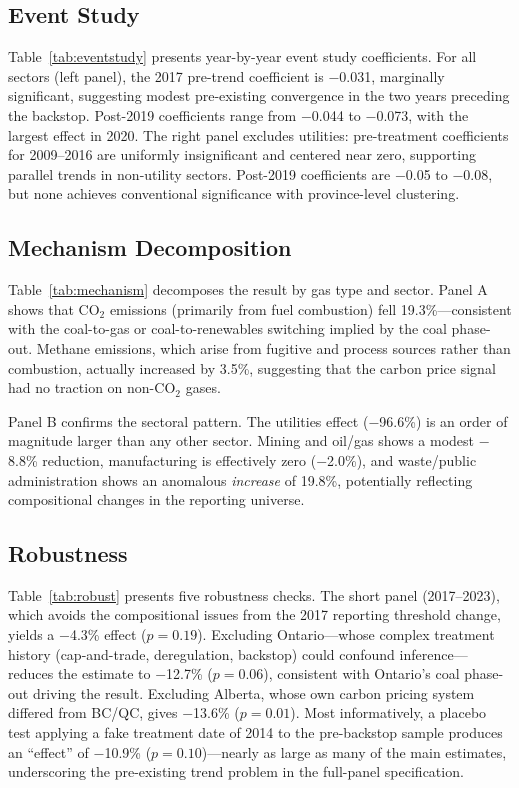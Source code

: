 \documentclass[12pt]{article}
\begin{document}
\subsection{Event Study}



Table~\ref{tab:eventstudy} presents year-by-year event study coefficients. For all sectors (left panel), the 2017 pre-trend coefficient is $-$0.031, marginally significant, suggesting modest pre-existing convergence in the two years preceding the backstop. Post-2019 coefficients range from $-$0.044 to $-$0.073, with the largest effect in 2020. The right panel excludes utilities: pre-treatment coefficients for 2009--2016 are uniformly insignificant and centered near zero, supporting parallel trends in non-utility sectors. Post-2019 coefficients are $-$0.05 to $-$0.08, but none achieves conventional significance with province-level clustering.

\subsection{Mechanism Decomposition}



Table~\ref{tab:mechanism} decomposes the result by gas type and sector. Panel A shows that CO$_2$ emissions (primarily from fuel combustion) fell 19.3\%---consistent with the coal-to-gas or coal-to-renewables switching implied by the coal phase-out. Methane emissions, which arise from fugitive and process sources rather than combustion, actually increased by 3.5\%, suggesting that the carbon price signal had no traction on non-CO$_2$ gases.

Panel B confirms the sectoral pattern. The utilities effect ($-$96.6\%) is an order of magnitude larger than any other sector. Mining and oil/gas shows a modest $-$8.8\% reduction, manufacturing is effectively zero ($-$2.0\%), and waste/public administration shows an anomalous \textit{increase} of 19.8\%, potentially reflecting compositional changes in the reporting universe.


\subsection{Robustness}



Table~\ref{tab:robust} presents five robustness checks. The short panel (2017--2023), which avoids the compositional issues from the 2017 reporting threshold change, yields a $-$4.3\% effect ($p = 0.19$). Excluding Ontario---whose complex treatment history (cap-and-trade, deregulation, backstop) could confound inference---reduces the estimate to $-$12.7\% ($p = 0.06$), consistent with Ontario's coal phase-out driving the result. Excluding Alberta, whose own carbon pricing system differed from BC/QC, gives $-$13.6\% ($p = 0.01$). Most informatively, a placebo test applying a fake treatment date of 2014 to the pre-backstop sample produces an ``effect'' of $-$10.9\% ($p = 0.10$)---nearly as large as many of the main estimates, underscoring the pre-existing trend problem in the full-panel specification.
\end{document}
